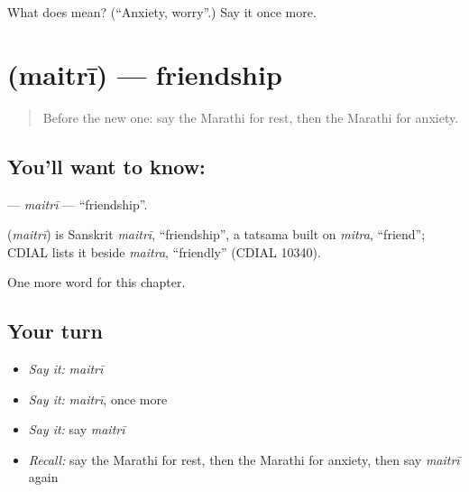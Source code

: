 \begin{tcolorbox}[breakable,colback=teal!4,colframe=teal!35!black,title={Before you move on}]
What does  mean? (\textquotedblleft{}Anxiety, worry\textquotedblright{}.) Say it once more.
\end{tcolorbox}
\section[\texorpdfstring{\mr{मैत्री} (maitrī)}{मैत्री (maitrī)}]{ (maitrī) — friendship}

\label{lesson:MR-C257-maitri}



\begin{quote}
Before the new one: say the Marathi for rest, then the Marathi for anxiety.
\end{quote}

\subsection*{You'll want to know: }
\textbf{} — \emph{maitrī} — \textquotedblleft{}friendship\textquotedblright{}.

\begin{cousinweb}
\textbf{} (\emph{maitrī}) is Sanskrit \emph{maitrī}, \textquotedblleft{}friendship\textquotedblright{}, a tatsama built on \emph{mitra}, \textquotedblleft{}friend\textquotedblright{}; CDIAL lists it beside \emph{maitra}, \textquotedblleft{}friendly\textquotedblright{} (CDIAL 10340).
\end{cousinweb}

\begin{grammarlens}[title={What you've built}]
One more word for this chapter.
\end{grammarlens}

\subsection*{Your turn}
\begin{itemize}
\raggedright
  \item \emph{Say it:} \emph{maitrī}
  \item \emph{Say it:} \emph{maitrī}, once more
  \item \emph{Say it:} say \emph{maitrī}
  \item \emph{Recall:} say the Marathi for rest, then the Marathi for anxiety, then say \emph{maitrī} again
\end{itemize}

